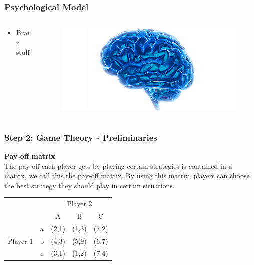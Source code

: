\documentclass{beamer}
\begin{document}
\begin{frame}
\frametitle{Psychological Model}

\begin{columns}
  \begin{column}{0.5\textwidth}
    \begin{itemize}
    \item Brain stuff
    \end{itemize}
  \end{column}
  
  \begin{column}{0.5\textwidth}
    \begin{figure}[ht!]
      \includegraphics[scale=0.3]{psychological.jpg}
    \end{figure} 
  \end{column}
\end{columns}

\end{frame}


\begin{frame}
\frametitle{Step 2: Game Theory - Preliminaries}

\textbf{Pay-off matrix}\\
The pay-off each player gets by playing certain strategies is contained in a matrix, we call this the pay-off matrix. By using this matrix, players can choose the best strategy they should play in certain situations.

\begin{example}
\begin{table}[ht!]
	\hspace{-4em}
	\centering
	\begin{tabular}{ccccc|}
		& & \multicolumn{3}{c}{Player 2}                                \\ \cline{3-5}
		& & A & B & \multicolumn{1}{c}{C}                               \\ \cline{3-5}
		\multirow{3}{*}{Player 1} & \multicolumn{1}{|c|}{a} & (2,1) & (1,3) & (7,2) \\
		& \multicolumn{1}{|c|}{b} & (4,3) & (5,9) & (6,7)                           \\
		& \multicolumn{1}{|c|}{c} & (3,1) & (1,2) & (7,4)                           \\ \cline{3-5}
	\end{tabular}
\end{table}
\end{example}

\end{frame}
\end{document}
